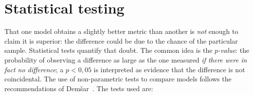 \section{Statistical testing}
\label{sec:tests}

That one model obtains a slightly better metric than another is \emph{not} enough to claim it is superior: the difference could be due to the chance of the particular sample. Statistical tests quantify that doubt. The common idea is the \emph{$p$-value}: the probability of observing a difference as large as the one measured \emph{if there were in fact no difference}; a $p<0{,}05$ is interpreted as evidence that the difference is not coincidental. The use of non-parametric tests to compare models follows the recommendations of Dem\v{s}ar~\cite{demsar2006}. The tests used are:

